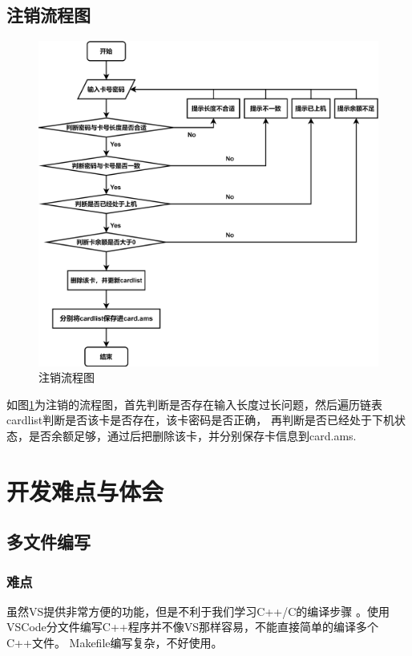 \documentclass{article}
\begin{document}
    \subsection{注销流程图}
    \begin{figure}[!h]
        \centering
        \includegraphics[scale=0.125]{figure/annul_pic.png}
        \caption{注销流程图}
        \label{annul_pic}
    \end{figure}
    如图\ref{annul_pic}为注销的流程图，首先判断是否存在输入长度过长问题，然后遍历链表cardlist判断是否该卡是否存在，该卡密码是否正确，
    再判断是否已经处于下机状态，是否余额足够，通过后把删除该卡，并分别保存卡信息到card.ams.
    \newpage
    \section{开发难点与体会}
    \subsection{多文件编写}
    \subsubsection{难点}   
    虽然VS提供非常方便的功能，但是不利于我们学习C++/C的编译步骤 。使用VSCode分文件编写C++程序并不像VS那样容易，不能直接简单的编译多个C++文件。
    Makefile编写复杂，不好使用。
\end{document}
